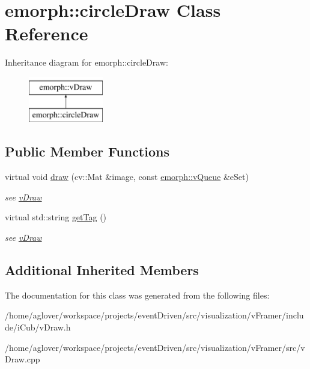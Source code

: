 \hypertarget{classemorph_1_1circleDraw}{\section{emorph\-:\-:circle\-Draw Class Reference}
\label{classemorph_1_1circleDraw}
}
Inheritance diagram for emorph\-:\-:circle\-Draw\-:\begin{figure}[H]
\begin{center}
\leavevmode
\includegraphics[height=2.000000cm]{classemorph_1_1circleDraw}
\end{center}
\end{figure}
\subsection*{Public Member Functions}
\begin{DoxyCompactItemize}
\item 
\hypertarget{classemorph_1_1circleDraw_a03dde28736c280049798d5f9619a8be5}{virtual void \hyperlink{classemorph_1_1circleDraw_a03dde28736c280049798d5f9619a8be5}{draw} (cv\-::\-Mat \&image, const \hyperlink{classemorph_1_1vQueue}{emorph\-::v\-Queue} \&e\-Set)}\label{classemorph_1_1circleDraw_a03dde28736c280049798d5f9619a8be5}

\begin{DoxyCompactList}\small\item\em see \hyperlink{classemorph_1_1vDraw}{v\-Draw} \end{DoxyCompactList}\item 
\hypertarget{classemorph_1_1circleDraw_ae725bd75bc70f72c14c1d01e0365080b}{virtual std\-::string \hyperlink{classemorph_1_1circleDraw_ae725bd75bc70f72c14c1d01e0365080b}{get\-Tag} ()}\label{classemorph_1_1circleDraw_ae725bd75bc70f72c14c1d01e0365080b}

\begin{DoxyCompactList}\small\item\em see \hyperlink{classemorph_1_1vDraw}{v\-Draw} \end{DoxyCompactList}\end{DoxyCompactItemize}
\subsection*{Additional Inherited Members}


The documentation for this class was generated from the following files\-:\begin{DoxyCompactItemize}
\item 
/home/aglover/workspace/projects/event\-Driven/src/visualization/v\-Framer/include/i\-Cub/v\-Draw.\-h\item 
/home/aglover/workspace/projects/event\-Driven/src/visualization/v\-Framer/src/v\-Draw.\-cpp\end{DoxyCompactItemize}
